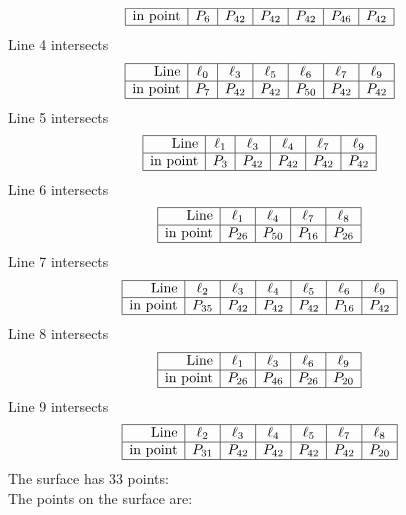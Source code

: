 \documentclass{article}
\begin{document}
{$$\begin{array}{|r*{6}{|c}|}
\hline
\mbox{in point}  & P_{6} & P_{42} & P_{42} & P_{42} & P_{46} & P_{42}\\
\hline
\end{array}
$$
Line 4 intersects 
$$
\begin{array}{|r*{6}{|c}|}
\hline
\mbox{Line}  & \ell_{0} & \ell_{3} & \ell_{5} & \ell_{6} & \ell_{7} & \ell_{9}\\
\hline
\mbox{in point}  & P_{7} & P_{42} & P_{42} & P_{50} & P_{42} & P_{42}\\
\hline
\end{array}
$$
Line 5 intersects 
$$
\begin{array}{|r*{5}{|c}|}
\hline
\mbox{Line}  & \ell_{1} & \ell_{3} & \ell_{4} & \ell_{7} & \ell_{9}\\
\hline
\mbox{in point}  & P_{3} & P_{42} & P_{42} & P_{42} & P_{42}\\
\hline
\end{array}
$$
Line 6 intersects 
$$
\begin{array}{|r*{4}{|c}|}
\hline
\mbox{Line}  & \ell_{1} & \ell_{4} & \ell_{7} & \ell_{8}\\
\hline
\mbox{in point}  & P_{26} & P_{50} & P_{16} & P_{26}\\
\hline
\end{array}
$$
Line 7 intersects 
$$
\begin{array}{|r*{6}{|c}|}
\hline
\mbox{Line}  & \ell_{2} & \ell_{3} & \ell_{4} & \ell_{5} & \ell_{6} & \ell_{9}\\
\hline
\mbox{in point}  & P_{35} & P_{42} & P_{42} & P_{42} & P_{16} & P_{42}\\
\hline
\end{array}
$$
Line 8 intersects 
$$
\begin{array}{|r*{4}{|c}|}
\hline
\mbox{Line}  & \ell_{1} & \ell_{3} & \ell_{6} & \ell_{9}\\
\hline
\mbox{in point}  & P_{26} & P_{46} & P_{26} & P_{20}\\
\hline
\end{array}
$$
Line 9 intersects 
$$
\begin{array}{|r*{6}{|c}|}
\hline
\mbox{Line}  & \ell_{2} & \ell_{3} & \ell_{4} & \ell_{5} & \ell_{7} & \ell_{8}\\
\hline
\mbox{in point}  & P_{31} & P_{42} & P_{42} & P_{42} & P_{42} & P_{20}\\
\hline
\end{array}
$$
The surface has 33 points:\\
The points on the surface are:\\
}
\end{document}

